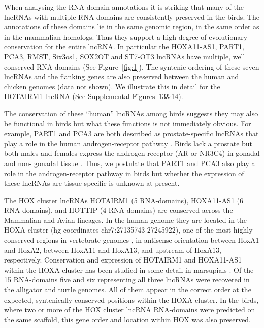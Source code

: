 \documentclass[10pt]{bmc_article}
\newenvironment{bmcformat}{\begin{raggedright}\baselineskip20pt\sloppy\setboolean{publ}{false}}{\end{raggedright}\baselineskip20pt\sloppy}
\begin{document}
\begin{bmcformat}
When analysing the RNA-domain annotations it is striking that many of
the lncRNAs with multiple RNA-domains are consistently preserved in
the birds. The annotations of these domains lie in the same genomic
region, in the same order as in the mammalian homologs. Thus they
support a high degree of evolutionary conservation for the entire
lncRNA. In particular the HOXA11-AS1, PART1, PCA3, RMST, Six3os1,
SOX2OT and ST7-OT3 lncRNAs have multiple, well conserved RNA-domains
(See Figure~\ref{fig:1}). The syntenic ordering of these seven lncRNAs
and the flanking genes are also preserved between the human and
chicken genomes (data not shown). We illustrate this in detail for the
HOTAIRM1 lncRNA (See Supplemental Figures~13\&14).



The conservation of these ``human'' lncRNAs among birds suggests they may 
also be functional in birds but what these
functions is not immediately obvious. For example, PART1 and
PCA3 are both described as prostate-specific lncRNAs that play a role
in the human androgen-receptor pathway
\cite{Bussemakers:1999,Lin:2000,Ferreira:2012}. Birds lack a prostate
but both males and females express the androgen receptor (AR or NR3C4) in gonadal
and non- gonadal tissue
\cite{Yoshimura:1993,Veney:2004,Fuxjager:2012,Leska:2012}. Thus, we
postulate that PART1 and PCA3 also play a role in the
androgen-receptor pathway in birds but whether the expression of these
lncRNAs are tissue specific is unknown at present.

The HOX cluster lncRNAs HOTAIRM1 (5 RNA-domains), HOXA11-AS1 (6
RNA-domains), and HOTTIP (4 RNA domains) are conserved across the
Mammalian and Avian lineages. In the human genome they are located in
the HOXA cluster (hg coordinates chr7:27135743-27245922), one of the
most highly conserved regions in vertebrate genomes
\cite{PascualAnaya:13}, in antisense orientation between HoxA1 and
HoxA2, between HoxA11 and HoxA13, and upstream of HoxA13,
respectively. Conservation and expression of HOTAIRM1 and HOXA11-AS1
within the HOXA cluster has been studied in some detail in marsupials
\cite{Yu:12}.  Of the 15 RNA-domains five and six representing all
three lncRNAs were recovered in the alligator and turtle genomes. All
of them appear in the correct order at the expected, syntenically
conserved positions within the HOXA cluster.  In the birds, where two
or more of the HOX cluster lncRNA RNA-domains were predicted on the
same scaffold, this gene order and location within HOX was also
preserved.


\end{bmcformat}
\end{document}
